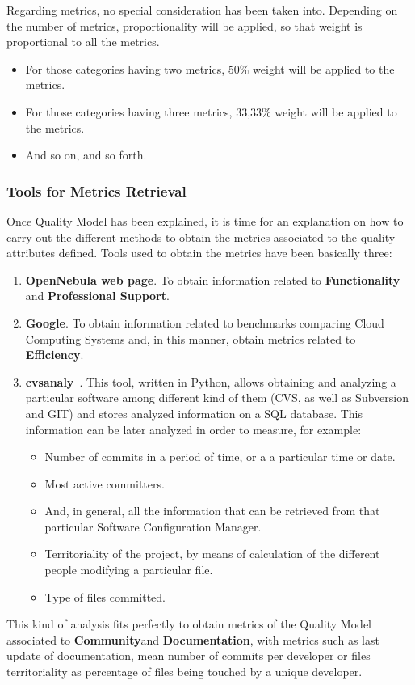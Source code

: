 \documentclass[11pt]{article}
\begin{document}
Regarding metrics, no special consideration has been taken into. Depending on the number of metrics, proportionality will be applied, so that weight is proportional to all the metrics. 
\begin{itemize}\itemsep0pt
\item{For those categories having two metrics, 50\% weight will be applied to the metrics.}
\item{For those categories having three metrics, 33,33\% weight will be applied to the metrics.}
\item{And so on, and so forth.}
\end{itemize}

\subsubsection{Tools for Metrics Retrieval}

Once Quality Model has been explained, it is time for an explanation on how to carry out the different methods to obtain the metrics associated to the quality attributes defined. Tools used to obtain the metrics have been basically three:
\begin{enumerate}\itemsep0pt
\item{\textbf{OpenNebula web page}}. To obtain information related to \textbf{Functionality} and \textbf{Professional Support}.
\item{\textbf{Google}}. To obtain information related to benchmarks comparing Cloud Computing Systems and, in this manner, obtain metrics related to \textbf{Efficiency}.
\item{\textbf{cvsanaly}}~\cite{CVSANALY00}. This tool, written in Python, allows obtaining and analyzing a particular software among different kind of them (CVS, as well as Subversion and GIT) and stores analyzed information on a SQL database. This information can be later analyzed in order to measure, for example:
\begin{itemize}\itemsep0pt
\item{Number of commits in a period of time, or a a particular time or date}.
\item{Most active committers}.
\item{And, in general, all the information that can be retrieved from that particular Software Configuration Manager}.
\item{Territoriality of the project, by means of calculation of the different people modifying a particular file}.
\item{Type of files committed}.
\end{itemize}
\end{enumerate}
This kind of analysis fits perfectly to obtain metrics of the Quality Model associated to \textbf{Community}and \textbf{Documentation}, with metrics such as last update of documentation, mean number of commits per developer or files territoriality as percentage of files being touched by a unique developer.
\end{document}
